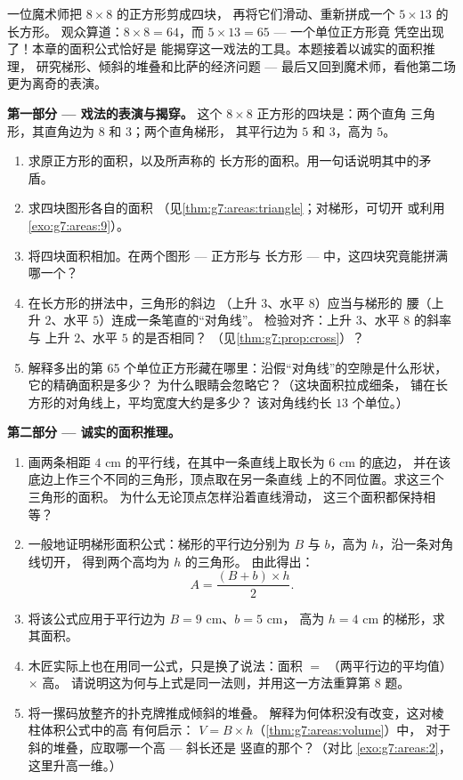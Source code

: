 \begin{problem}[{周末问题 --- 一个著名的“证明”声称
$64 = 65$，借面积与斜率揭穿，
并以比萨与圆环作甜点}]
\label{pb:g7:areas:1}
一位魔术师把 $8 \times 8$ 的正方形剪成四块，
再将它们滑动、重新拼成一个 $5 \times 13$ 的长方形。
观众算道：$8 \times 8 = 64$，而
$5 \times 13 = 65$ --- 一个单位正方形竟
凭空出现了！本章的面积公式恰好是
能揭穿这一戏法的工具。本题接着以诚实的面积推理，
研究梯形、倾斜的堆叠和比萨的经济问题 ---
最后又回到魔术师，看他第二场
更为离奇的表演。

\medskip
\noindent\textbf{第一部分 --- 戏法的表演与揭穿。}
这个 $8 \times 8$ 正方形的四块是：两个直角
三角形，其直角边为 $8$ 和 $3$；两个直角梯形，
其平行边为 $5$ 和 $3$，高为 $5$。
\begin{enumerate}
  \item 求原正方形的面积，以及所声称的
        长方形的面积。用一句话说明其中的矛盾。
  \item 求四块图形各自的面积
        （见\cref{thm:g7:areas:triangle}；对梯形，可切开
        或利用\cref{exo:g7:areas:9}）。
  \item 将四块面积相加。在两个图形 --- 正方形与
        长方形 --- 中，这四块究竟能拼满哪一个？
  \item 在长方形的拼法中，三角形的斜边
        （上升 $3$、水平 $8$）应当与梯形的
        腰（上升 $2$、水平 $5$）连成一条笔直的“对角线”。
        检验对齐：上升 $3$、水平 $8$ 的斜率与
        上升 $2$、水平 $5$ 的是否相同？
        （见\cref{thm:g7:prop:cross}）？
  \item 解释多出的第 65 个单位正方形藏在哪里：沿假“对角线”的空隙是什么形状，
        它的精确面积是多少？
        为什么眼睛会忽略它？（这块面积拉成细条，
        铺在长方形的对角线上，平均宽度大约是多少？
        该对角线约长 $13$ 个单位。）
\end{enumerate}

\medskip
\noindent\textbf{第二部分 --- 诚实的面积推理。}
\begin{enumerate}[resume]
  \item 画两条相距 $4$ cm 的平行线，在其中一条直线上取长为 $6$ cm 的底边，
        并在该底边上作三个不同的三角形，顶点取在另一条直线
        上的不同位置。求这三个三角形的面积。
        为什么无论顶点怎样沿着直线滑动，
        这三个面积都保持相等？
  \item 一般地证明梯形面积公式：梯形的平行边分别为
        $B$ 与 $b$，高为 $h$，沿一条对角线切开，
        得到两个高均为 $h$ 的三角形。
        由此得出：
        \[
        A = \frac{(B + b) \times h}{2} .
        \]
  \item 将该公式应用于平行边为 $B = 9$ cm、$b = 5$ cm，
        高为 $h = 4$ cm 的梯形，求其面积。
  \item 木匠实际上也在用同一公式，只是换了说法：面积 $=$
        （两平行边的平均值）$\times$ 高。
        请说明这为何与上式是同一法则，并用这一方法重算第
        8 题。
  \item 将一摞码放整齐的扑克牌推成倾斜的堆叠。
        解释为何体积没有改变，这对棱柱体积公式中的高
        有何启示：
        $V = B \times h$（\cref{thm:g7:areas:volume}）中，
        对于斜的堆叠，应取哪一个高 --- 斜长还是
        竖直的那个？（对比
        \cref{exo:g7:areas:2}，这里升高一维。）
\end{enumerate}


\end{problem}
